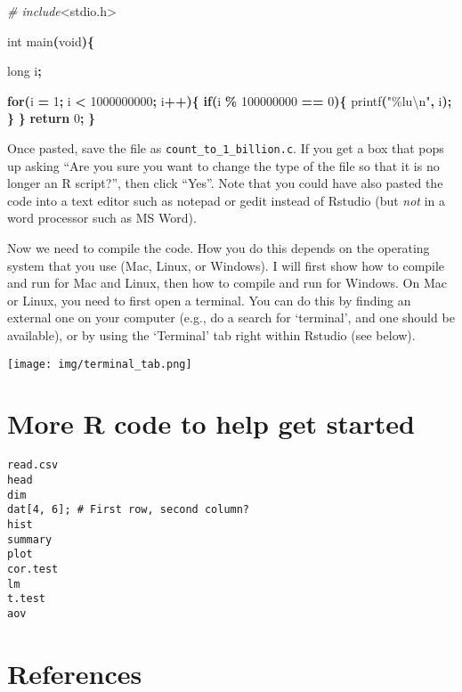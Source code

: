 \documentclass[
]{article}
\newenvironment{Shaded}{\begin{snugshade}}{\end{snugshade}}
\newcommand{\ControlFlowTok}[1]{\textcolor[rgb]{0.13,0.29,0.53}{\textbf{#1}}}
\newcommand{\DataTypeTok}[1]{\textcolor[rgb]{0.13,0.29,0.53}{#1}}
\newcommand{\DecValTok}[1]{\textcolor[rgb]{0.00,0.00,0.81}{#1}}
\newcommand{\ImportTok}[1]{#1}
\newcommand{\NormalTok}[1]{#1}
\newcommand{\OperatorTok}[1]{\textcolor[rgb]{0.81,0.36,0.00}{\textbf{#1}}}
\newcommand{\PreprocessorTok}[1]{\textcolor[rgb]{0.56,0.35,0.01}{\textit{#1}}}
\newcommand{\SpecialCharTok}[1]{\textcolor[rgb]{0.00,0.00,0.00}{#1}}
\newcommand{\StringTok}[1]{\textcolor[rgb]{0.31,0.60,0.02}{#1}}
\begin{document}
\begin{Shaded}
\begin{Highlighting}[]
\PreprocessorTok{\# include}\ImportTok{\textless{}stdio.h\textgreater{}}

\DataTypeTok{int}\NormalTok{ main}\OperatorTok{(}\DataTypeTok{void}\OperatorTok{)\{}

    \DataTypeTok{long}\NormalTok{ i}\OperatorTok{;}

    \ControlFlowTok{for}\OperatorTok{(}\NormalTok{i }\OperatorTok{=} \DecValTok{1}\OperatorTok{;}\NormalTok{ i }\OperatorTok{\textless{}} \DecValTok{1000000000}\OperatorTok{;}\NormalTok{ i}\OperatorTok{++)\{}
       \ControlFlowTok{if}\OperatorTok{(}\NormalTok{i }\OperatorTok{\%} \DecValTok{100000000} \OperatorTok{==} \DecValTok{0}\OperatorTok{)\{}
\NormalTok{           printf}\OperatorTok{(}\StringTok{"\%lu}\SpecialCharTok{\textbackslash{}n}\StringTok{"}\OperatorTok{,}\NormalTok{ i}\OperatorTok{);}
       \OperatorTok{\}}
    \OperatorTok{\}}
    \ControlFlowTok{return} \DecValTok{0}\OperatorTok{;}
\OperatorTok{\}}
\end{Highlighting}
\end{Shaded}

Once pasted, save the file as \texttt{count\_to\_1\_billion.c}. If you
get a box that pops up asking ``Are you sure you want to change the type
of the file so that it is no longer an R script?'', then click ``Yes''.
Note that you could have also pasted the code into a text editor such as
notepad or gedit instead of Rstudio (but \emph{not} in a word processor
such as MS Word).

Now we need to compile the code. How you do this depends on the
operating system that you use (Mac, Linux, or Windows). I will first
show how to compile and run for Mac and Linux, then how to compile and
run for Windows. On Mac or Linux, you need to first open a terminal. You
can do this by finding an external one on your computer (e.g., do a
search for `terminal', and one should be available), or by using the
`Terminal' tab right within Rstudio (see below).

\texttt{[image: img/terminal\_tab.png]}

\hypertarget{more-r-code-to-help-get-started}{%
\section{More R code to help get
started}\label{more-r-code-to-help-get-started}}

\begin{verbatim}
read.csv
head
dim
dat[4, 6]; # First row, second column?
hist
summary
plot
cor.test
lm
t.test
aov
\end{verbatim}

\hypertarget{references}{%
\section{References}\label{references}}
\end{document}
